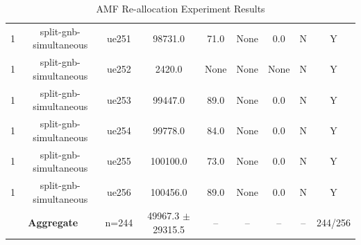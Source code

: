 \begin{table}[ht]
\begin{tabular}{|c|c|c|c|c|c|c|c|c|}
1 & split-gnb-simultaneous & ue251 & 98731.0 & 71.0 & None & 0.0 & N & Y \\
1 & split-gnb-simultaneous & ue252 & 2420.0 & None & None & None & N & Y \\
1 & split-gnb-simultaneous & ue253 & 99447.0 & 89.0 & None & 0.0 & N & Y \\
1 & split-gnb-simultaneous & ue254 & 99778.0 & 84.0 & None & 0.0 & N & Y \\
1 & split-gnb-simultaneous & ue255 & 100100.0 & 73.0 & None & 0.0 & N & Y \\
1 & split-gnb-simultaneous & ue256 & 100456.0 & 89.0 & None & 0.0 & N & Y \\
\multicolumn{2}{|c|}{\textbf{Aggregate}} & n=244 & 49967.3 $\pm$ 29315.5 & -- & -- & -- & -- & 244/256 \\
\hline
\end{tabular}
\caption{AMF Re-allocation Experiment Results}
\label{tab:amf_realloc}
\end{table}
